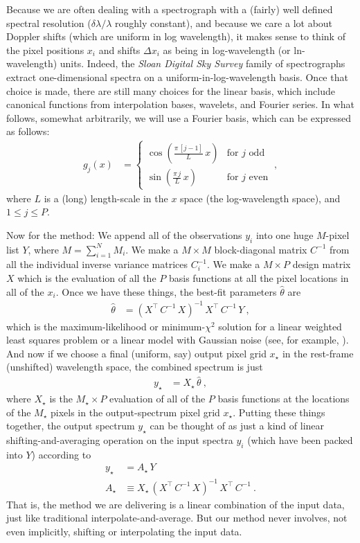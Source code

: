 \documentclass[modern]{aastex631}
\begin{document}
Because we are often dealing with a spectrograph with a (fairly) well defined spectral resolution ($\delta\lambda/\lambda$ roughly constant), and because we care a lot about Doppler shifts (which are uniform in log wavelength), it makes sense to think of the pixel positions $x_i$ and shifts $\Delta x_i$ as being in log-wavelength (or ln-wavelength) units.
Indeed, the \textsl{Sloan Digital Sky Survey} family of spectrographs extract one-dimensional spectra on a uniform-in-log-wavelength basis.
Once that choice is made, there are still many choices for the linear basis,
which include canonical functions from interpolation bases, wavelets, and Fourier series.
In what follows, somewhat arbitrarily, we will use a Fourier basis, which can be expressed as follows:
\begin{align}
    g_j(x) & = \left\{\begin{array}{cl}\displaystyle\cos\left(\frac{\pi\,[j-1]}{L}\,x\right) & \mbox{for $j$ odd} \\[3ex]
                                       \displaystyle\sin\left(\frac{\pi\,j}{L}\,x\right) & \mbox{for $j$ even}\end{array}\right. ~,
\end{align}
where $L$ is a (long) length-scale in the $x$ space (the log-wavelength space), and $1\leq j\leq P$.

Now for the method:
We append all of the observations $y_i$ into one huge $M$-pixel list $Y$, where $M=\sum_{i=1}^N M_i$.
We make a $M\times M$ block-diagonal matrix $C^{-1}$ from all the individual inverse variance matrices $C_i^{-1}$.
We make a $M\times P$ design matrix $X$ which is the evaluation of all the $P$ basis functions at all the pixel locations in all of the $x_i$.
Once we have these things, the best-fit parameters $\hat\theta$ are
\begin{align}
    \hat\theta &= (X^\top\,C^{-1}\,X)^{-1}\,X^\top\,C^{-1}\,Y ~,
\end{align}
which is the maximum-likelihood or minimum-$\chi^2$ solution for a linear weighted least squares problem or a linear model with Gaussian noise (see, for example, \citealt{fitting}).
And now if we choose a final (uniform, say) output pixel grid $x_\star$ in the rest-frame (unshifted) wavelength space, the combined spectrum is just
\begin{align}
    y_\star &= X_\star\,\hat\theta ~,
\end{align}
where $X_\star$ is the $M_\star\times P$ evaluation of all of the $P$ basis functions at the locations of the $M_\star$ pixels in the output-spectrum pixel grid $x_\star$.
Putting these things together, the output spectrum $y_\star$ can be thought of as just a kind of linear shifting-and-averaging operation on the input spectra $y_i$ (which have been packed into $Y$) according to
\begin{align}
    y_\star &= A_\star\,Y \\
    A_\star &\equiv X_\star\,(X^\top\,C^{-1}\,X)^{-1}\,X^\top\,C^{-1} ~.
\end{align}
That is, the method we are delivering is a linear combination of the input data, just like traditional interpolate-and-average.
But our method never involves, not even implicitly, shifting or interpolating the input data.
\end{document}
